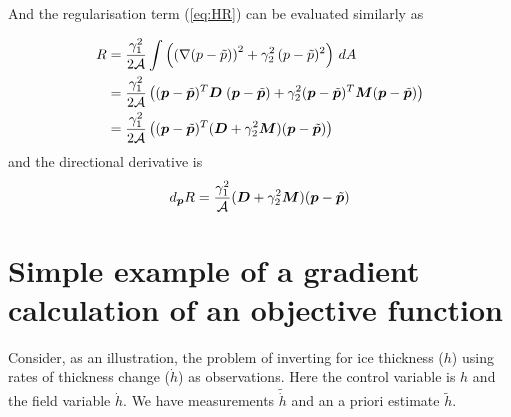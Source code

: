 \documentclass[10pt,a4paper]{book}
\begin{document}
And the regularisation term (\ref{eq:HR}) can be evaluated similarly as

\begin{align*}
R 
&= \frac{\gamma_1^2}{2\cal{A}} \int \left (  \left ( \nabla( p - \tilde{p}) \right )^2 + \gamma_2^2 \, (p-\tilde{p})^2 \right ) \, dA \\
&= \frac{\gamma_1^2}{2\cal{A}} \left (  (\bm{p}-\tilde{\bm{p}})^T \bm{D} \; (\bm{p} - \tilde{\bm{p}}) + \gamma_2^2 (\bm{p}-\tilde{\bm{p}})^T \bm{M} (\bm{p} - \tilde{\bm{p}}) \right )\\
&= \frac{\gamma_1^2}{2\cal{A}} \left (  (\bm{p}-\tilde{\bm{p}})^T (\bm{D} + \gamma_2^2 \bm{M}) (\bm{p} - \tilde{\bm{p}}) \right )
\end{align*}
and the directional derivative is
\[
d_{\bm{p}} R =\frac{\gamma_1^2}{\cal{A}} (\bm{D}+\gamma_2^2 \bm{M}) (\bm{p}-\tilde{\bm{p}})
\]

\section{Simple example of a gradient calculation of an objective function}

Consider, as an illustration, the problem of inverting for ice
thickness ($h$) using rates of thickness change ($\dot{h}$) as
observations. Here the control variable is $h$ and the field variable
$\dot{h}$. We have measurements $\tilde{\dot{h}}$ and an a priori
estimate $\tilde{h}$.
\end{document}
